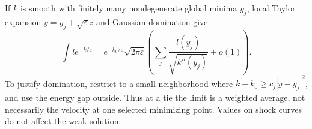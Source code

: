 If $k$ is smooth with finitely many nondegenerate global minima $y_j$,
local Taylor expansion $y=y_j+\sqrt\varepsilon z$ and Gaussian
domination give
\[
 \int l e^{-k/\varepsilon}
 =e^{-k_0/\varepsilon}\sqrt{2\pi\varepsilon}
       \left(\sum_j\frac{l(y_j)}{\sqrt{k''(y_j)}}+o(1)\right).
\]
To justify domination, restrict to a small neighborhood where
$k-k_0\geq c_j|y-y_j|^2$, and use the energy gap outside.
Thus at a tie the limit is a weighted average, not necessarily
the velocity at one selected minimizing point.
Values on shock curves do not affect the weak solution.

